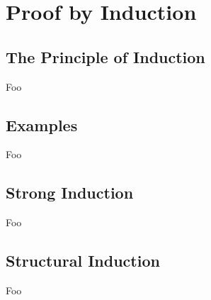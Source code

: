 \section{Proof by Induction}

\subsection{The Principle of Induction}

Foo

\subsection{Examples}

Foo

\subsection{Strong Induction}

Foo

\subsection{Structural Induction}

Foo

